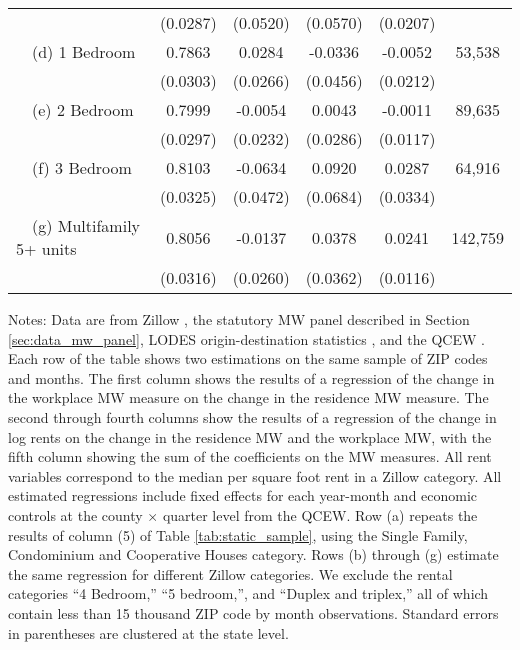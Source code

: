 \begin{landscape}
\begin{table}[ht!]
\begin{tabular}{@{}lccccc@{}}
                                                 & (0.0287) & (0.0520) & (0.0570) & (0.0207) &      \\
        $\quad$(d) 1 Bedroom                     &  0.7863  &  0.0284  &  -0.0336  &  -0.0052  & 53,538 \\
                                                 & (0.0303) & (0.0266) & (0.0456) & (0.0212) &      \\
        $\quad$(e) 2 Bedroom                     &  0.7999  &  -0.0054  &  0.0043  &  -0.0011  & 89,635 \\
                                                 & (0.0297) & (0.0232) & (0.0286) & (0.0117) &      \\
        $\quad$(f) 3 Bedroom                     &  0.8103  &  -0.0634  &  0.0920  &  0.0287  & 64,916 \\
                                                 & (0.0325) & (0.0472) & (0.0684) & (0.0334) &      \\
        $\quad$(g) Multifamily 5+ units          &  0.8056  &  -0.0137  &  0.0378  &  0.0241  & 142,759 \\
                                                 & (0.0316) & (0.0260) & (0.0362) & (0.0116) &      \\ \bottomrule
    \end{tabular}

    \begin{minipage}{.95\linewidth} \footnotesize
        \vspace{2mm}
        Notes:
        Data are from Zillow \parencite{ZillowData}, 
        the statutory MW panel described in Section \ref{sec:data_mw_panel}, 
        LODES origin-destination statistics \parencite{CensusLODES},
        and the QCEW \parencite{QCEW}.
        Each row of the table shows two estimations on the same sample of ZIP 
        codes and months.
        The first column shows the results of a regression of the change in the 
        workplace MW measure on the change in the residence MW measure.
        The second through fourth columns show the results of a regression of 
        the change in log rents on the change in the residence MW and the 
        workplace MW, with the fifth column showing the sum of the coefficients 
        on the MW measures.
        All rent variables correspond to the median per square foot rent in a 
        Zillow category.
        All estimated regressions include fixed effects for each year-month and 
        economic controls at the county $\times$ quarter level from the QCEW.
        Row (a) repeats the results of column (5) of Table \ref{tab:static_sample}, 
        using the Single Family, Condominium and Cooperative Houses category.
        Rows (b) through (g) estimate the same regression for different Zillow 
        categories.
        We exclude the rental categories ``4 Bedroom,'' ``5 bedroom,'', and 
        ``Duplex and triplex,'' all of which contain less than 15 thousand
        ZIP code by month observations.
        Standard errors in parentheses are clustered at the state level.
    \end{minipage}
\end{table}
\end{landscape}
